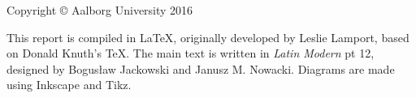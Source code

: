 \strut\vfill %
\noindent Copyright \copyright{} Aalborg University 2016\par
\vspace{0.2cm}

\noindent This report is compiled in \LaTeX, originally developed by Leslie Lamport, based on Donald Knuth's \TeX. The main text is written in \emph{Latin Modern} pt 12, designed by Bogusław Jackowski and Janusz M. Nowacki. 
Diagrams are made using Inkscape and Tikz.%
\clearpage